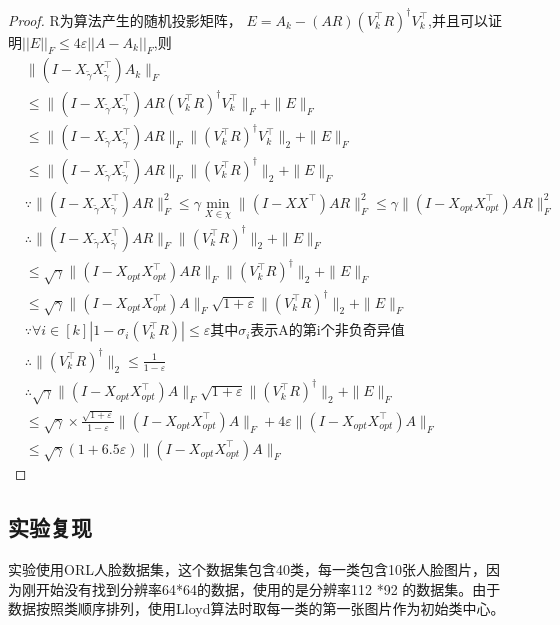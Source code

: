 \documentclass{ctexart}
\begin{document}
\begin{proof}
    R为算法产生的随机投影矩阵，
    $E = A_{k} - (AR)(V_{k}^{\top}R)^{\dagger}V_{k}^{\top}$,并且可以证明$\left | \left |E\right | \right | _{F} \le 4\varepsilon\left | \left |A - A_{k}\right | \right | _{F}$,则
    \begin{align*}
    &\|(I - X_{\tilde{\gamma}}X_{\tilde{\gamma}}^{\top})A_{k}\|_{F}\\
    &    \le \|(I - X_{\tilde{\gamma}}X_{\tilde{\gamma}}^{\top})AR(V_{k}^{\top}R)^{\dagger}V_{k}^{\top}\|_{F} + \|E\|_{F}\\
    & \le \|(I - X_{\tilde{\gamma}}X_{\tilde{\gamma}}^{\top})AR\|_{F}\|(V_{k}^{\top}R)^{\dagger}V_{k}^{\top}\|_{2} + \|E\|_{F}\\
    &    \le \|(I - X_{\tilde{\gamma}}X_{\tilde{\gamma}}^{\top})AR\|_{F}\|(V_{k}^{\top}R)^{\dagger}\|_{2} + \|E\|_{F}\\
    &    \because \|(I - X_{\tilde{\gamma}}X_{\tilde{\gamma}}^{\top})AR\|_{F}^2 \le \gamma\mathop{\min}_{X \in \chi}
    \|(I - XX^{\top})AR\|_{F}^2 \le \gamma \|(I - X_{opt}X_{opt}^{\top})AR\|_{F}^2\\
    & \therefore  \|(I - X_{\tilde{\gamma}}X_{\tilde{\gamma}}^{\top})AR\|_{F}\|(V_{k}^{\top}R)^{\dagger}\|_{2} + \|E\|_{F}\\
    &\le \sqrt{\gamma}\|(I - X_{opt}X_{opt}^{\top})AR\|_{F}\|(V_{k}^{\top}R)^{\dagger}\|_{2} + \|E\|_{F}\\
    &\le \sqrt{\gamma}\|(I - X_{opt}X_{opt}^{\top})A\|_{F}\sqrt{1+\varepsilon}\|(V_{k}^{\top}R)^{\dagger}\|_{2} + \|E\|_{F}\\
    &\because \forall i \in [k] |1 - \sigma_{i}(V_{k}^{\top}R)| \le \varepsilon \text{其中} \sigma_{i} \text{表示A的第i个非负奇异值} \\
    &\therefore \|(V_{k}^{\top}R)^{\dagger}\|_{2} \le \frac{1}{1-\varepsilon}\\
    &\therefore \sqrt{\gamma}\|(I - X_{opt}X_{opt}^{\top})A\|_{F}\sqrt{1+\varepsilon}\|(V_{k}^{\top}R)^{\dagger}\|_{2} + \|E\|_{F}\\
    &\le \sqrt{\gamma} \times \frac{\sqrt{1+\varepsilon}}{1-\varepsilon}\|(I - X_{opt}X_{opt}^{\top})A\|_{F}
    + 4\varepsilon \|(I - X_{opt}X_{opt}^{\top})A\|_{F}\\
    &\le \sqrt{\gamma} (1+6.5\varepsilon)\|(I - X_{opt}X_{opt}^{\top})A\|_{F}
    \end{align*}
    \end{proof}

    \subsection{实验复现}
    实验使用ORL人脸数据集，这个数据集包含40类，每一类包含10张人脸图片，因为刚开始没有找到分辨率64*64的数据，使用的是分辨率112 *92 的数据集。由于数据按照类顺序排列，使用Lloyd算法时取每一类的第一张图片作为初始类中心。\\
\end{document}
